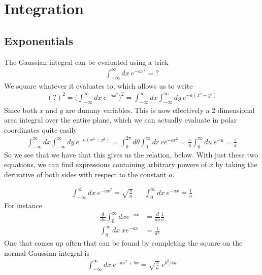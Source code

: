 
\section{Integration}



\subsection{Exponentials}
The Gaussian integral can be evaluated using a trick
\begin{align}
	\int_{-\infty}^\infty dx~e^{-ax^2} = ?
\end{align}
We square whatever it evaluates to, which allows us to write
\begin{align}
	(?)^2 = \Big(\int_{-\infty}^\infty dx~e^{-ax^2}\Big)^2 = \int_{-\infty}^\infty dx \int_{-\infty}^\infty dy~e^{-a(x^2+y^2)}
\end{align}
Since both $x$ and $y$ are dummy variables. This is now effectively a 2 dimensional area integral over the entire plane, which we can actually evaluate in polar coordinates quite easily
\begin{align}
	\int_{-\infty}^\infty dx \int_{-\infty}^\infty dy~e^{-a(x^2+y^2)} = \int_0^{2\pi} d\theta \int_0^\infty dr~re^{-ar^2} = \frac{\pi}{a} \int_0^\infty du~ e^{-u} = \frac{\pi}{a}
\end{align}
So we see that we have that this gives us the relation, below. With just these two equations, we can find expressions containing arbitrary powers of $x$ by taking the derivative of both sides with respect to the constant $a$.

\begin{align}
\int_{-\infty}^\infty dx ~e^{-ax^2} = \sqrt{\frac{\pi}{a}}
&&\int_0^\infty dx~e^{-a x} = \frac{1}{a}
\end{align}
For instance
\begin{align}
\frac{d}{da}\int_0^\infty dx e^{-a x} &= \frac{d}{da}\frac{1}{a}\\
\int_0^\infty dx~ x e^{-ax} &= \frac{1}{a^2}
\end{align}
One that comes up often that can be found by completing the square on the normal Gaussian integral is
\begin{align}
	\int_{-\infty}^\infty dx ~e^{-ax^2 + bx} = \sqrt{\frac{\pi}{a}}~e^{b^2/4a}
\end{align}


